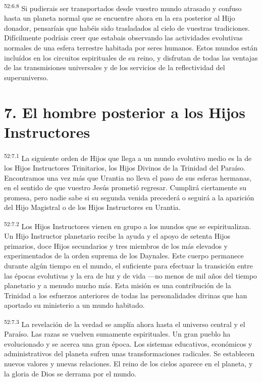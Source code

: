 \par
\textsuperscript{52:6.8} Si pudierais ser transportados desde vuestro mundo atrasado y confuso hasta un planeta normal que se encuentre ahora en la era posterior al Hijo donador, pensaríais que habéis sido trasladados al cielo de vuestras tradiciones. Difícilmente podríais creer que estabais observando las actividades evolutivas normales de una esfera terrestre habitada por seres humanos. Estos mundos están incluídos en los circuitos espirituales de su reino, y disfrutan de todas las ventajas de las transmisiones universales y de los servicios de la reflectividad del superuniverso.

\section*{7. El hombre posterior a los Hijos Instructores}
\par
\textsuperscript{52:7.1} La siguiente orden de Hijos que llega a un mundo evolutivo medio es la de los Hijos Instructores Trinitarios, los Hijos Divinos de la Trinidad del Paraíso. Encontramos una vez más que Urantia no lleva el paso de sus esferas hermanas, en el sentido de que vuestro Jesús prometió regresar. Cumplirá ciertamente su promesa, pero nadie sabe si su segunda venida precederá o seguirá a la aparición del Hijo Magistral o de los Hijos Instructores en Urantia.

\par
\textsuperscript{52:7.2} Los Hijos Instructores vienen en grupo a los mundos que se espiritualizan. Un Hijo Instructor planetario recibe la ayuda y el apoyo de setenta Hijos primarios, doce Hijos secundarios y tres miembros de los más elevados y experimentados de la orden suprema de los Daynales. Este cuerpo permanece durante algún tiempo en el mundo, el suficiente para efectuar la transición entre las épocas evolutivas y la era de luz y de vida ---no menos de mil años del tiempo planetario y a menudo mucho más. Esta misión es una contribución de la Trinidad a los esfuerzos anteriores de todas las personalidades divinas que han aportado su ministerio a un mundo habitado.

\par
\textsuperscript{52:7.3} La revelación de la verdad se amplía ahora hasta el universo central y el Paraíso. Las razas se vuelven sumamente espirituales. Un gran pueblo ha evolucionado y se acerca una gran época. Los sistemas educativos, económicos y administrativos del planeta sufren unas transformaciones radicales. Se establecen nuevos valores y nuevas relaciones. El reino de los cielos aparece en el planeta, y la gloria de Dios se derrama por el mundo.

